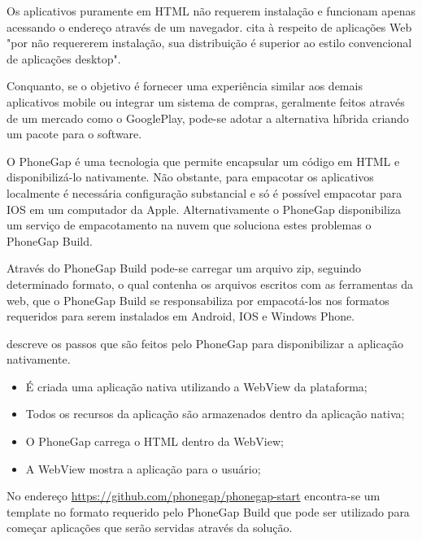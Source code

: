 Os aplicativos puramente em HTML não requerem instalação e
funcionam apenas acessando o endereço através de um navegador.
\citet{browserGamesTechnologyAndFuture} cita à respeito de
aplicações Web "por não requererem instalação, sua distribuição é
superior ao estilo convencional de aplicações desktop".

Conquanto, se o objetivo é fornecer uma experiência similar aos
demais aplicativos mobile ou integrar um sistema de compras, geralmente
feitos através de um mercado como o GooglePlay, pode-se adotar a
alternativa híbrida criando um pacote para o software.

O PhoneGap é uma tecnologia que permite encapsular um código em
HTML e disponibilizá-lo nativamente. Não obstante, para empacotar
os aplicativos localmente é necessária configuração substancial
e só é possível empacotar para IOS em um computador da Apple.
Alternativamente o PhoneGap disponibiliza um serviço de empacotamento
na nuvem que soluciona estes problemas o PhoneGap Build.

Através do PhoneGap Build pode-se carregar um arquivo zip, seguindo
determinado formato, o qual contenha os arquivos escritos com as
ferramentas da web, que o PhoneGap Build se responsabiliza por
empacotá-los nos formatos requeridos para serem instalados em Android,
IOS e Windows Phone.

\citet{publishHtml5} descreve os passos que são feitos pelo PhoneGap para 
disponibilizar a aplicação nativamente.

\begin{itemize}
\item É criada uma aplicação nativa utilizando a WebView da plataforma;
\item Todos os recursos da aplicação são armazenados dentro da aplicação nativa;
\item O PhoneGap carrega o HTML dentro da WebView;
\item A WebView mostra a aplicação para o usuário;
\end{itemize}

No endereço \url{https://github.com/phonegap/phonegap-start}
encontra-se um template no formato requerido pelo PhoneGap Build que
pode ser utilizado para começar aplicações que serão servidas
através da solução.
